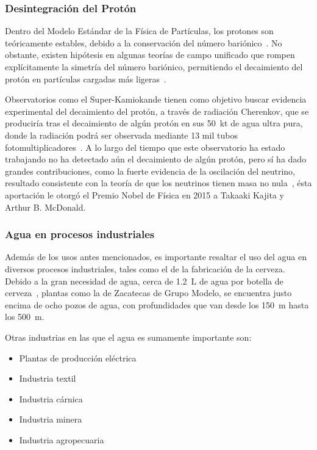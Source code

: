 \subsubsection{Desintegración del Protón}

Dentro del Modelo Estándar de la Física de Partículas, los protones son
teóricamente estables, debido a la conservación del número
bariónico~\cite{standarmodel}. No obstante, existen hipótesis en algunas
teorías de campo unificado que rompen explícitamente la simetría del número
bariónico, permitiendo el decaimiento del protón en partículas cargadas más
ligeras~\cite{Kuhne:2011zz}.

Observatorios como el Super-Kamiokande tienen como objetivo buscar evidencia
experimental del decaimiento del protón, a través de radiación Cherenkov, que
se produciría tras el decaimiento de algún protón en sus  \SI{50}{\kilo\tonne}
de agua ultra pura, donde la radiación podrá ser observada mediante \num{13}
mil tubos fotomultiplicadores~\cite{Kamioka}.  A lo largo del tiempo que este
observatorio ha estado trabajando no ha detectado aún el decaimiento de algún
protón, pero sí ha dado grandes contribuciones, como la fuerte evidencia de la
oscilación del neutrino, resultado consistente con la teoría de que los
neutrinos tienen masa no nula~\cite{10.2307/26058368}, ésta aportación le
otorgó el Premio Nobel de Física en 2015 a Takaaki Kajita y Arthur B. McDonald.

\subsubsection{Agua en procesos industriales}

Además de los usos antes mencionados, es importante resaltar el uso del agua en
diversos procesos industriales, tales como el de la fabricación de la cerveza.
Debido a la gran necesidad de agua, cerca de \SI{1.2}{\liter} de agua por
botella de cerveza~\cite{grupomodelo}, plantas como la de Zacatecas de Grupo
Modelo, se encuentra justo encima de ocho pozos de agua, con profundidades que
van desde los \SI{150}{\metre} hasta los \SI{500}{\metre}.

Otras industrias en las que el agua es sumamente importante son:

\begin{itemize}
\item Plantas de producción eléctrica
\item Industria textil
\item Industria cárnica
\item Industria minera
\item Industria agropecuaria
\end{itemize}


